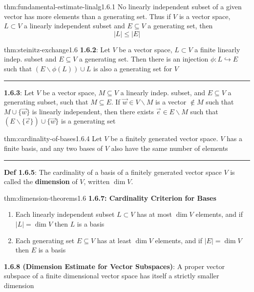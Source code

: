 \documentclass[landscape, 8pt]{extarticle}
\begin{document}
\begin{multicols}{3}
\begin{thm}{thm:fundamental-estimate-linalg}{1.6.1}
    No linearly independent subset of a given vector has more elements than a generating set. Thus if $V$ is a vector space, $L \subset V$ a linearly independent subset and $E \subseteq V$ a generating set, then
    \[\lvert L \rvert \le \lvert E \rvert\]
\end{thm} 

\begin{thm}{thm:steinitz-exchange}{1.6}
    \textbf{1.6.2}: Let $V$ be a vector space, $L \subset V$ a finite linearly indep. subset and $E \subseteq V$ a generating set. Then there is an injection $\phi : L \hookrightarrow E$ such that $(E \backslash \phi(L)) \cup L$ is also a generating set for $V$
    
    \vspace{-5pt}
    \noindent\rule{\textwidth}{0.2pt}
    \textbf{1.6.3}: Let $V$ be a vector space, $M \subseteq V$ a linearly indep. subset, and $E \subseteq V$ a generating subset, such that $M \subseteq E$. If $\vec{w}\in V\backslash M$ is a vector $\not\in M$ such that $M \cup \{ \vec{w}\}$ is linearly independent, then there exists $\vec{e}\in E \backslash M$ such that $(E \backslash \{\vec{e}\}) \cup \{\vec{w}\}$ is a generating set
\end{thm}


\begin{thm}{thm:cardinality-of-bases}{1.6.4}
    Let $V$ be a finitely generated vector space. $V$ has a finite basis, and any two bases of $V$ also have the same number of elements

    \noindent\rule{\textwidth}{0.2pt}
    \textbf{Def 1.6.5}: The cardinality of a basis of a finitely generated vector space $V$ is called the \textbf{dimension} of $V$, written $\dim V$. 
\end{thm}

\begin{thm}{thm:dimension-theorems}{1.6}
    \textbf{1.6.7: Cardinality Criterion for Bases}
    \vspace{-5pt}
    \begin{enumerate}
        \setlength\itemsep{0em}
        \item Each linearly independent subset $L \subset V$ has at most $\dim V$ elements, and if $\lvert L \rvert = \dim V$ then $L$ is a basis
        \vspace{-3pt}
        \item Each generating set $E \subseteq V$ has at least $\dim V$ elements, and if $\lvert E \rvert = \dim V$ then $E$ is a basis
    \end{enumerate}
    \textbf{1.6.8 (Dimension Estimate for Vector Subspaces)}: A proper vector subspace of a finite dimensional vector space has itself a strictly smaller dimension


\end{thm}
\end{multicols}
\end{document}
